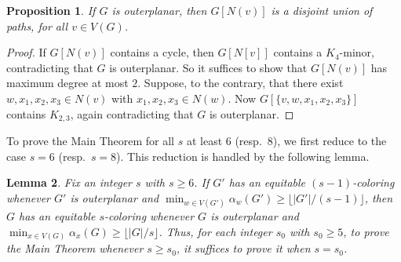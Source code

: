 \documentclass[11pt]{article}
\newtheorem{lem}{Lemma}
\newtheorem{prop}[lem]{Proposition}
\theoremstyle{definition}
\newcommand\floor[1]{\lfloor#1\rfloor}
\renewcommand\ge\geqslant
\begin{document}
\begin{prop}
\label{linear-forest}
If $G$ is outerplanar, then $G[N(v)]$ is a disjoint union of paths, for all $v\in V(G)$.
\end{prop}
\begin{proof}
If $G[N(v)]$ contains a cycle, then $G[N[v]]$ contains a $K_4$-minor, contradicting that $G$ is outerplanar.  So it suffices to show that $G[N(v)]$ has maximum degree at most $2$.
Suppose, to the contrary, that there exist $w,x_1,x_2,x_3\in N(v)$ with $x_1,x_2,x_3 \in N(w)$.  Now $G[\{v,w,x_1,x_2,x_3\}]$ contains $K_{2,3}$, again contradicting that $G$ is outerplanar.
\end{proof}
	
To prove the Main Theorem for all $s$ at least $6$ (resp.~$8$), we first reduce to the case $s=6$ (resp.~$s=8$).  
This reduction is handled by the following lemma.
\begin{lem}
\label{reduce-to-small-s-lem}
\label{lem1}
	Fix an integer $s$ with $s\ge 6$. If $G'$ has an equitable $(s-1)$-coloring whenever $G'$ is outerplanar and 
	$\min_{w\in V(G')}\alpha_{w}(G')\ge \floor{|G'|/(s-1)}$,
	then $G$ has an equitable $s$-coloring whenever $G$ is outerplanar and $\min_{x\in V(G)} \alpha_x(G)\ge \floor{|G|/s}$.
	Thus, for each integer $s_0$ with $s_0\ge 5$, to prove the Main Theorem whenever $s\ge s_0$, it suffices to prove it when $s=s_0$.
\label{reduc-to-small-lem}
\end{lem}
\end{document}
